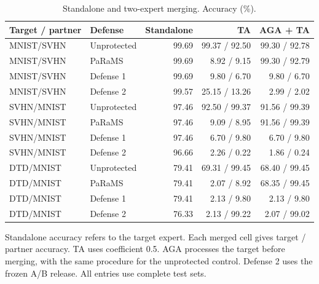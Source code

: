 \begin{table}[t]
\centering\small
\setlength{\tabcolsep}{4pt}
\caption{Standalone and two-expert merging. Accuracy (\%).}
\label{tab:paper_main}
\begin{tabular}{@{}llrrr@{}}
\toprule
Target / partner & Defense & Standalone & TA & AGA + TA \\
\midrule
MNIST/SVHN & Unprotected & 99.69 & 99.37 / 92.50 & 99.30 / 92.78 \\
MNIST/SVHN & PaRaMS & 99.69 & 8.92 / 9.15 & 99.30 / 92.79 \\
MNIST/SVHN & Defense 1 & 99.69 & 9.80 / 6.70 & 9.80 / 6.70 \\
MNIST/SVHN & Defense 2 & 99.57 & 25.15 / 13.26 & 2.99 / 2.02 \\
\midrule
SVHN/MNIST & Unprotected & 97.46 & 92.50 / 99.37 & 91.56 / 99.39 \\
SVHN/MNIST & PaRaMS & 97.46 & 9.09 / 8.95 & 91.56 / 99.39 \\
SVHN/MNIST & Defense 1 & 97.46 & 6.70 / 9.80 & 6.70 / 9.80 \\
SVHN/MNIST & Defense 2 & 96.66 & 2.26 / 0.22 & 1.86 / 0.24 \\
\midrule
DTD/MNIST & Unprotected & 79.41 & 69.31 / 99.45 & 68.40 / 99.45 \\
DTD/MNIST & PaRaMS & 79.41 & 2.07 / 8.92 & 68.35 / 99.45 \\
DTD/MNIST & Defense 1 & 79.41 & 2.13 / 9.80 & 2.13 / 9.80 \\
DTD/MNIST & Defense 2 & 76.33 & 2.13 / 99.22 & 2.07 / 99.02 \\
\bottomrule
\end{tabular}
\par\smallskip
\begin{minipage}{\textwidth}\footnotesize Standalone accuracy refers to the target expert. Each merged cell gives target / partner accuracy. TA uses coefficient 0.5. AGA processes the target before merging, with the same procedure for the unprotected control. Defense 2 uses the frozen A/B release. All entries use complete test sets.\end{minipage}
\end{table}
